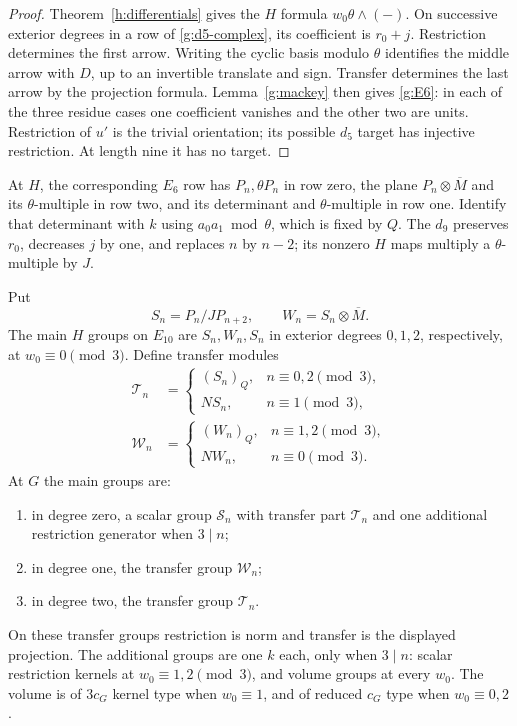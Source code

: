 \begin{proof}
Theorem~\ref{h:differentials} gives the $H$ formula
$w_0\theta\wedge(-)$.  On successive exterior degrees in a row
of \eqref{g:d5-complex}, its coefficient is $r_0+j$.  Restriction
determines the first arrow.  Writing the cyclic basis modulo
$\theta$ identifies the middle arrow with $D$, up to an
invertible translate and sign.  Transfer determines the last
arrow by the projection formula.  Lemma~\ref{g:mackey} then
gives \eqref{g:E6}: in each of the three residue cases one
coefficient vanishes and the other two are units.  Restriction
of $u'$ is the trivial orientation; its possible $d_5$ target
has injective restriction.  At length nine it has no target.
\end{proof}

At $H$, the corresponding $E_6$ row has $P_n,\theta P_n$ in
row zero, the plane $P_n\otimes\overline M$ and its
$\theta$-multiple in row two, and its determinant and
$\theta$-multiple in row one.  Identify that determinant with
$k$ using $a_0a_1\bmod\theta$, which is fixed by $Q$.
The $d_9$ preserves $r_0$, decreases $j$ by one, and replaces
$n$ by $n-2$; its nonzero $H$ maps multiply a
$\theta$-multiple by $J$.

\begin{proposition}\label{g:E10-description}
Put
\[
 S_n=P_n/JP_{n+2},\qquad W_n=S_n\otimes\overline M.
\]
The main $H$ groups on $E_{10}$ are $S_n,W_n,S_n$ in
exterior degrees $0,1,2$, respectively, at $w_0\equiv0\pmod3$.
Define transfer modules
\begin{align}
 \mathcal T_n&=
 \begin{cases}(S_n)_Q,&n\equiv0,2\pmod3,\\
 NS_n,&n\equiv1\pmod3,
 \end{cases}\label{g:Tn}\\
 \mathcal W_n&=
 \begin{cases}(W_n)_Q,&n\equiv1,2\pmod3,\\
 NW_n,&n\equiv0\pmod3.
 \end{cases}\label{g:Wn}
\end{align}
At $G$ the main groups are:
\begin{enumerate}
\item in degree zero, a scalar group $\mathcal S_n$ with transfer
part $\mathcal T_n$ and one additional restriction generator
when $3\mid n$;
\item in degree one, the transfer group $\mathcal W_n$;
\item in degree two, the transfer group $\mathcal T_n$.
\end{enumerate}
On these transfer groups restriction is norm and transfer is the
displayed projection.  The additional groups are one $k$ each,
only when $3\mid n$: scalar restriction kernels at
$w_0\equiv1,2\pmod3$, and volume groups at every $w_0$.
The volume is of $3c_G$ kernel type when $w_0\equiv1$, and
of reduced $c_G$ type when $w_0\equiv0,2$.
\end{proposition}

